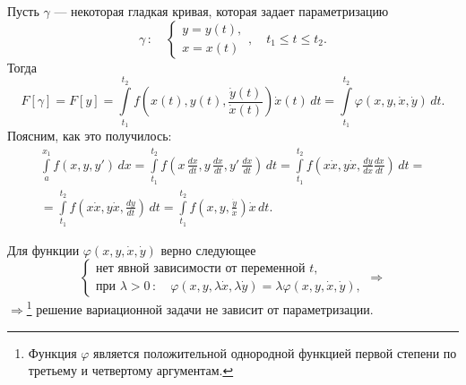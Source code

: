 \documentclass[12pt,a5paper]{book}
\begin{document}
	Пусть $\gamma$ --- некоторая гладкая кривая, которая задает параметризацию
	\begin{equation*}
		\gamma\,: \quad \begin{cases}
			y = y(t), \\
			x = x(t)
		\end{cases}, \quad t_1 \leq t \leq t_2.
	\end{equation*}
	Тогда
	\begin{equation*}
		F[\gamma] = F[y] = \int\limits_{t_1}^{t_2} f\left(x(t), y(t), \frac{\dot{y}(t)}{\dot{x}(t)}\right)\dot{x}(t)\,dt = \int\limits_{t_1}^{t_2} \varphi\left(x, y, \dot{x}, \dot{y}\right)\,dt.
	\end{equation*}
	Поясним, как это получилось:
	\begin{equation*}
		\begin{split}
			\int\limits_a^{x_1} f(x,y,y')\,dx = \int\limits_{t_1}^{t_2} f\left(x\,\frac{dx}{dt}, y\,\frac{dx}{dt}, y'\,\frac{dx}{dt}\right)\,dt = \int\limits_{t_1}^{t_2} f\left(x\dot{x}, y\dot{x}, \frac{dy}{dx}\frac{dx}{dt}\right)\,dt = \\ = \int\limits_{t_1}^{t_2} f\left(x\dot{x}, y\dot{x}, \frac{dy}{dt}\right)\,dt = \int\limits_{t_1}^{t_2} f\left(x, y, \frac{\dot{y}}{\dot{x}}\right)\dot{x}\,dt.
		\end{split}
	\end{equation*}
	
	Для функции $\varphi(x,y,\dot{x},\dot{y})$ верно следующее
	\begin{equation*}
		\begin{cases}
			\text{нет явной зависимости от переменной $t$}, \\
			\text{при } \lambda > 0\,: \quad \varphi(x,y,\lambda\dot{x},\lambda\dot{y}) = \lambda\varphi(x,y,\dot{x},\dot{y}),
		\end{cases} \Rightarrow
	\end{equation*}
	$\Rightarrow$\footnote{Функция $\varphi$ является положительной однородной функцией первой степени по третьему и четвертому аргументам.} решение вариационной задачи не зависит от параметризации.
	
\end{document}
